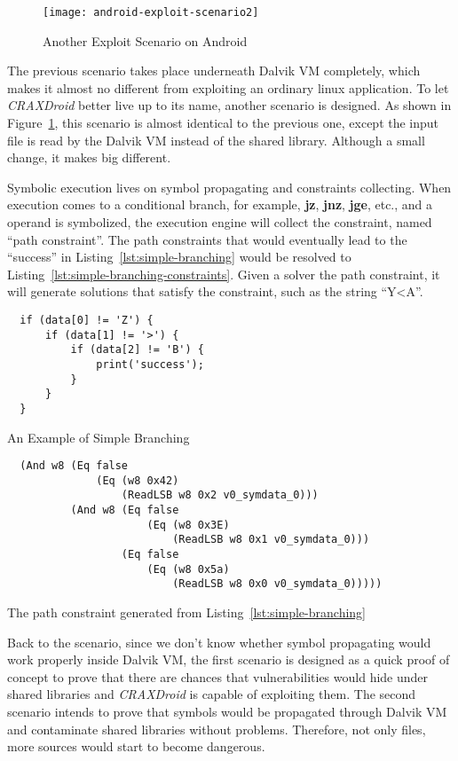 \begin{figure}[!ht]
  \texttt{[image: android-exploit-scenario2]}
  \caption{Another Exploit Scenario on Android}
  \label{fig:android-exploit-scenario2}
\end{figure}

The previous scenario takes place underneath Dalvik VM completely, which makes
it almost no different from exploiting an ordinary linux application. To let
\emph{CRAXDroid} better live up to its name, another scenario is designed. As
shown in Figure~\ref{fig:android-exploit-scenario2}, this scenario is almost
identical to the previous one, except the input file is read by the Dalvik VM
instead of the shared library. Although a small change, it makes big different.

Symbolic execution lives on symbol propagating and constraints collecting. When
execution comes to a conditional branch, for example, \textbf{jz},
\textbf{jnz}, \textbf{jge}, etc., and a operand is symbolized, the execution
engine will collect the constraint, named ``path constraint''. The path
constraints that would eventually lead to the ``success'' in
Listing~\ref{lst:simple-branching} would be resolved to
Listing~\ref{lst:simple-branching-constraints}. Given a solver the path
constraint, it will generate solutions that satisfy the constraint, such as the
string ``Y\textless A''.

\begin{listing}[H]
  \begin{verbatim}
  if (data[0] != 'Z') {
      if (data[1] != '>') {
          if (data[2] != 'B') {
              print('success');
          }
      }
  }
  \end{verbatim}
  \caption{An Example of Simple Branching}
  \label{lst:simple-branching}
\end{listing}

\begin{listing}[H]
  \begin{verbatim}
  (And w8 (Eq false
              (Eq (w8 0x42)
                  (ReadLSB w8 0x2 v0_symdata_0)))
          (And w8 (Eq false
                      (Eq (w8 0x3E)
                          (ReadLSB w8 0x1 v0_symdata_0)))
                  (Eq false
                      (Eq (w8 0x5a)
                          (ReadLSB w8 0x0 v0_symdata_0)))))
  \end{verbatim}
  \caption{The path constraint generated from Listing~\ref{lst:simple-branching}}
  \label{lst:simple-branching-constraints}
\end{listing}

Back to the scenario, since we don't know whether symbol propagating would work
properly inside Dalvik VM, the first scenario is designed as a quick proof of
concept to prove that there are chances that vulnerabilities would hide under
shared libraries and \emph{CRAXDroid} is capable of exploiting them. The second
scenario intends to prove that symbols would be propagated through Dalvik VM
and contaminate shared libraries without problems. Therefore, not only files,
more sources would start to become dangerous.
